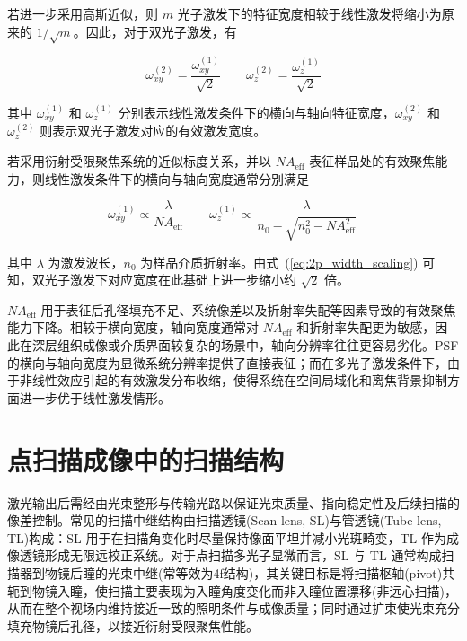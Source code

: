 若进一步采用高斯近似，则 $m$ 光子激发下的特征宽度相较于线性激发将缩小为原来的 $1/\sqrt m$。因此，对于双光子激发，有

\begin{equation}
  \omega_{xy}^{(2)}=\frac{\omega_{xy}^{(1)}}{\sqrt2} \qquad
  \omega_{z}^{(2)}=\frac{\omega_{z}^{(1)}}{\sqrt2}
  \label{eq:2p_width_scaling}
\end{equation}

其中 $\omega_{xy}^{(1)}$ 和 $\omega_{z}^{(1)}$ 分别表示线性激发条件下的横向与轴向特征宽度，$\omega_{xy}^{(2)}$ 和 $\omega_{z}^{(2)}$ 则表示双光子激发对应的有效激发宽度。

若采用衍射受限聚焦系统的近似标度关系，并以 $NA_{\mathrm{eff}}$ 表征样品处的有效聚焦能力，则线性激发条件下的横向与轴向宽度通常分别满足

\begin{equation}
  \omega_{xy}^{(1)} \propto \frac{\lambda}{NA_{\mathrm{eff}}}
  \qquad
  \omega_{z}^{(1)} \propto \frac{\lambda}{\,n_0-\sqrt{n_0^2-NA_{\mathrm{eff}}^2}\,}
  \label{eq:linear_width_scaling}
\end{equation}

其中 $\lambda$ 为激发波长，$n_0$ 为样品介质折射率。由式~(\ref{eq:2p_width_scaling}) 可知，双光子激发下对应宽度在此基础上进一步缩小约 $\sqrt2$ 倍。

$NA_{\mathrm{eff}}$ 用于表征后孔径填充不足、系统像差以及折射率失配等因素导致的有效聚焦能力下降。相较于横向宽度，轴向宽度通常对 $NA_{\mathrm{eff}}$ 和折射率失配更为敏感，因此在深层组织成像或介质界面较复杂的场景中，轴向分辨率往往更容易劣化。PSF 的横向与轴向宽度为显微系统分辨率提供了直接表征；而在多光子激发条件下，由于非线性效应引起的有效激发分布收缩，使得系统在空间局域化和离焦背景抑制方面进一步优于线性激发情形。



\section{点扫描成像中的扫描结构}\label{2.3}
激光输出后需经由光束整形与传输光路以保证光束质量、指向稳定性及后续扫描的像差控制。常见的扫描中继结构由扫描透镜(Scan lens, SL)与管透镜(Tube lens, TL)构成：SL 用于在扫描角变化时尽量保持像面平坦并减小光斑畸变，TL 作为成像透镜形成无限远校正系统。对于点扫描多光子显微而言，SL 与 TL 通常构成扫描器到物镜后瞳的光束中继(常等效为4f结构)，其关键目标是将扫描枢轴(pivot)共轭到物镜入瞳，使扫描主要表现为入瞳角度变化而非入瞳位置漂移(非远心扫描)，从而在整个视场内维持接近一致的照明条件与成像质量；同时通过扩束使光束充分填充物镜后孔径，以接近衍射受限聚焦性能。



